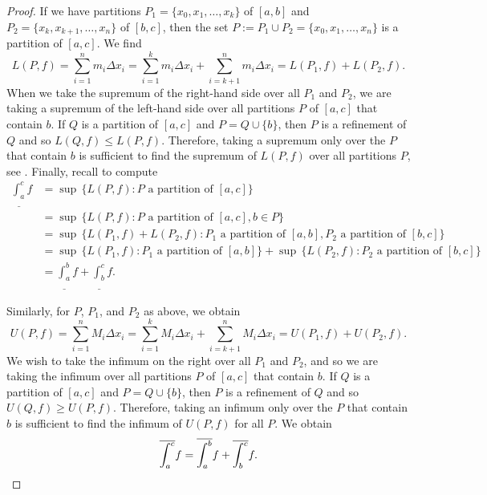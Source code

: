\begin{proof}
If we have partitions $P_1 = \{ x_0,x_1,\ldots,x_k \}$
of $[a,b]$ and $P_2 = \{ x_k, x_{k+1}, \ldots, x_n \}$ of $[b,c]$,
then the set $P := P_1 \cup P_2 = \{ x_0, x_1, \ldots, x_n \}$ is
a partition of $[a,c]$.  We find
\begin{equation*}
L(P,f) =
\sum_{i=1}^n m_i \Delta x_i
=
\sum_{i=1}^k m_i \Delta x_i
+
\sum_{i=k+1}^n m_i \Delta x_i
=
L(P_1,f) + L(P_2,f) .
\end{equation*}
When we take the supremum of the right-hand side over all $P_1$ and $P_2$,
we are taking a supremum of the left-hand side
over all partitions $P$ of $[a,c]$ that contain $b$.  If $Q$ is a partition
of $[a,c]$ and $P = Q \cup \{ b \}$, then $P$ is a refinement of $Q$
and so $L(Q,f) \leq L(P,f)$.  Therefore, taking a supremum only over the $P$
that contain $b$ is sufficient to find the supremum of $L(P,f)$
over all partitions $P$, see .
Finally, recall 
to compute
\begin{equation*}
\begin{split}
\underline{\int_a^c} f
& =
\sup \, \bigl\{ L(P,f) : P \text{ a partition of } [a,c] \bigr\}
\\
& =
\sup \, \bigl\{ L(P,f) : P \text{ a partition of } [a,c], b \in P \bigr\}
\\
& =
\sup \, \bigl\{ L(P_1,f) + L(P_2,f) :
P_1 \text{ a partition of } [a,b], P_2 \text{ a partition of } [b,c] \bigr\}
\\
& =
\sup \, \bigl\{ L(P_1,f) : P_1 \text{ a partition of } [a,b] \bigr\}
+
\sup \, \bigl\{ L(P_2,f) : P_2 \text{ a partition of } [b,c] \bigr\}
\\
&=
\underline{\int_a^b} f + \underline{\int_b^c} f .
\end{split}
\end{equation*}

Similarly, for $P$, $P_1$, and $P_2$ as above, we obtain
\begin{equation*}
U(P,f) =
\sum_{i=1}^n M_i \Delta x_i
=
\sum_{i=1}^k M_i \Delta x_i
+
\sum_{i=k+1}^n M_i \Delta x_i
=
U(P_1,f) + U(P_2,f) .
\end{equation*}
We wish to take the infimum on the right
over all $P_1$ and $P_2$, and so we are taking the infimum
over all partitions $P$ of $[a,c]$ that contain $b$.  If $Q$ is a partition
of $[a,c]$ and $P = Q \cup \{ b \}$, then $P$ is a refinement of $Q$
and so $U(Q,f) \geq U(P,f)$.  Therefore, taking an infimum only over the $P$
that contain $b$ is sufficient to find the infimum of $U(P,f)$ for
all $P$.
We obtain
\begin{equation*}
\overline{\int_a^c} f
=
\overline{\int_a^b} f + \overline{\int_b^c} f .  \qedhere
\end{equation*}
\end{proof}

